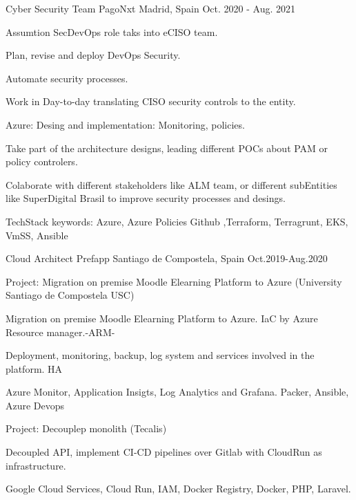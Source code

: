 \begin{cventries}
  \cventry
    {Cyber Security Team} %
    {PagoNxt} %
    {Madrid, Spain} %
    {Oct. 2020 - Aug. 2021} %
    {
     \begin{cvitems} %
        \item {Assumtion SecDevOps role taks into eCISO team.}
        \item {Plan, revise and deploy DevOps Security.}
        \item {Automate security processes.}
        \item {Work in Day-to-day translating CISO security controls to the entity.}
        \item {Azure: Desing and implementation: Monitoring, policies.}
        \item {Take part of the architecture designs, leading different POCs about PAM or policy controlers.}
        \item {Colaborate with different stakeholders like ALM team, or different subEntities like SuperDigital Brasil to improve security processes and desings.}
        \item {TechStack keywords: Azure, Azure Policies Github ,Terraform, Terragrunt, EKS, VmSS, Ansible }
    \end{cvitems}
    }

    \cventry
    {Cloud Architect} %
    {Prefapp} %
    {Santiago de Compostela, Spain} %
    {Oct.2019-Aug.2020} %
    {
      \begin{cvitems} %
        \item {Project: Migration on premise Moodle Elearning Platform to Azure (University Santiago de Compostela USC) }
        \item {Migration on premise Moodle Elearning Platform to Azure. IaC by Azure Resource manager.-ARM-}
        \item {Deployment, monitoring, backup, log system and services involved in the platform. HA}
        \item {Azure Monitor, Application Insigts, Log Analytics and Grafana. Packer, Ansible, Azure Devops}
        \item {Project: Decouplep monolith (Tecalis)}
        \item {Decoupled API, implement CI-CD pipelines over Gitlab with CloudRun as infrastructure.}
        \item {Google Cloud Services, Cloud Run, IAM, Docker Registry, Docker, PHP, Laravel.}
      \end{cvitems}
    }


\end{cventries}
